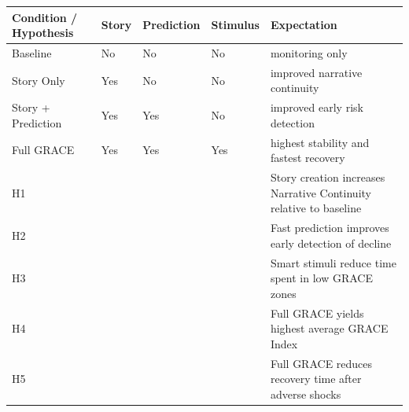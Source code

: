 \documentclass[
  journal,
]{IEEEtran}%
\newcounter{none} %
\begin{document}
{\def\LTcaptype{none} %
\begin{longtable}[]{@{}
  >{\raggedright\arraybackslash}p{}
  >{\raggedright\arraybackslash}p{}
  >{\raggedright\arraybackslash}p{}
  >{\raggedright\arraybackslash}p{}
  >{\raggedright\arraybackslash}p{}@{}}
\toprule\noalign{}
\begin{minipage}[b]{\linewidth}\raggedright
Condition / Hypothesis
\end{minipage} & \begin{minipage}[b]{\linewidth}\raggedright
Story
\end{minipage} & \begin{minipage}[b]{\linewidth}\raggedright
Prediction
\end{minipage} & \begin{minipage}[b]{\linewidth}\raggedright
Stimulus
\end{minipage} & \begin{minipage}[b]{\linewidth}\raggedright
Expectation
\end{minipage} \\
\midrule\noalign{}
\endhead
\bottomrule\noalign{}
\endlastfoot
Baseline & No & No & No & monitoring only \\
Story Only & Yes & No & No & improved narrative continuity \\
Story + Prediction & Yes & Yes & No & improved early risk detection \\
Full GRACE & Yes & Yes & Yes & highest stability and fastest recovery \\
H1 & & & & Story creation increases Narrative Continuity relative to
baseline \\
H2 & & & & Fast prediction improves early detection of decline \\
H3 & & & & Smart stimuli reduce time spent in low GRACE zones \\
H4 & & & & Full GRACE yields highest average GRACE Index \\
H5 & & & & Full GRACE reduces recovery time after adverse shocks \\
\end{longtable}
}
\end{document}
